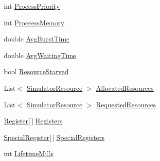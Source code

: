 \begin{DoxyCompactItemize}
\item 
int \hyperlink{class_c_p_u___o_s___simulator_1_1_operating___system_1_1_process_control_block_af0629b300d7f2ac582512e881c49f2ea}{Process\+Priority}
\item 
int \hyperlink{class_c_p_u___o_s___simulator_1_1_operating___system_1_1_process_control_block_a7a73f2ca49a669fc3d2693ee6d0b8aff}{Proceess\+Memory}
\item 
double \hyperlink{class_c_p_u___o_s___simulator_1_1_operating___system_1_1_process_control_block_a9420c2a711010a174586bb897c580e3f}{Avg\+Burst\+Time}
\item 
double \hyperlink{class_c_p_u___o_s___simulator_1_1_operating___system_1_1_process_control_block_ae03a95dce0f261ea4504a3f83b8950d4}{Avg\+Waiting\+Time}
\item 
bool \hyperlink{class_c_p_u___o_s___simulator_1_1_operating___system_1_1_process_control_block_a7fcc2cbbf3ea5f2611f83c742ef1003d}{Resource\+Starved}
\item 
List$<$ \hyperlink{class_c_p_u___o_s___simulator_1_1_operating___system_1_1_simulator_resource}{Simulator\+Resource} $>$ \hyperlink{class_c_p_u___o_s___simulator_1_1_operating___system_1_1_process_control_block_a05ff68677c2ea2b4784226838b035fc3}{Allocated\+Resources}
\item 
List$<$ \hyperlink{class_c_p_u___o_s___simulator_1_1_operating___system_1_1_simulator_resource}{Simulator\+Resource} $>$ \hyperlink{class_c_p_u___o_s___simulator_1_1_operating___system_1_1_process_control_block_ae0e0ef096393f21ca4f10f333f4f4003}{Requested\+Resources}
\item 
\hyperlink{class_c_p_u___o_s___simulator_1_1_c_p_u_1_1_register}{Register}\mbox{[}$\,$\mbox{]} \hyperlink{class_c_p_u___o_s___simulator_1_1_operating___system_1_1_process_control_block_abab92b09a34fb79823064fca79ed32ae}{Registers}
\item 
\hyperlink{class_c_p_u___o_s___simulator_1_1_c_p_u_1_1_special_register}{Special\+Register}\mbox{[}$\,$\mbox{]} \hyperlink{class_c_p_u___o_s___simulator_1_1_operating___system_1_1_process_control_block_af9716c755f2e5957ea4f4a7af4a7a190}{Special\+Registers}
\item 
int \hyperlink{class_c_p_u___o_s___simulator_1_1_operating___system_1_1_process_control_block_ae285b06f82507297a0f006ff3bece008}{Lifetime\+Mills}
\end{DoxyCompactItemize}
